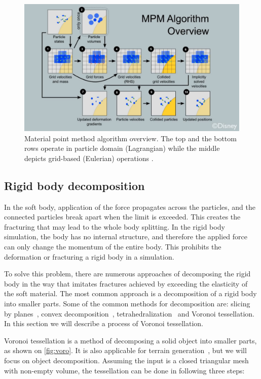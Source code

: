 \begin{figure}
\centering
\includegraphics[width=\textwidth]{img/MPM}
\caption{Material point method algorithm overview. The top and the bottom rows operate in particle domain (Lagrangian) while the middle depicts grid-based (Eulerian) operations \cite{disney}.
}
\label{fig:mpm}
\end{figure}

\subsection{Rigid body decomposition}
In the soft body, application of the force propagates across the particles, and the connected particles break apart when the limit is exceeded. This creates the fracturing that may lead to the whole body splitting. In the rigid body simulation, the body has no internal structure, and therefore the applied force can only change the momentum of the entire body. This prohibits the deformation or fracturing a rigid body in a simulation.

To solve this problem, there are numerous approaches of decomposing the rigid body in the way that imitates fractures achieved by exceeding the elasticity of the soft material. The most common approach is a decomposition of a rigid body into smaller parts. Some of the common methods for decomposition are: slicing by planes~\cite{minettooptimal}, convex decomposition~\cite{Lien:2007:ACD:1236246.1236265}, tetrahedralization~\cite{frey1996delaunay} and Voronoi tessellation. In this section we will describe a process of Voronoi tessellation.

Voronoi tessellation is a method of decomposing a solid object into smaller parts, as shown on \cref{fig:voro}. It is also applicable for \eg terrain generation~\cite{voronoiterrainrealtime}, but we will focus on object decomposition. Assuming the input is a closed triangular mesh with non-empty volume, the tessellation can be done in following three steps:

